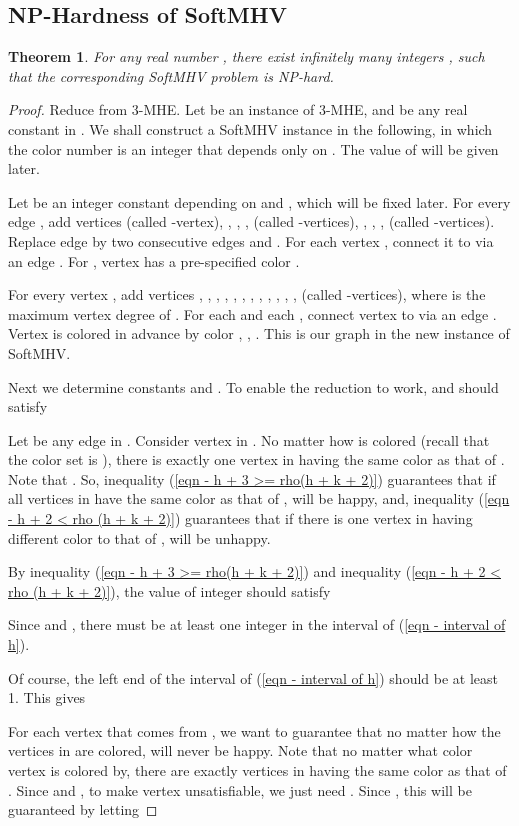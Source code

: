 \documentclass[11pt]{article}
\newtheorem{theorem}{Theorem}[section]
\begin{document}
\subsection{NP-Hardness of SoftMHV}
\begin{theorem}
For any real number , there exist infinitely many integers
, such that the corresponding SoftMHV problem is NP-hard.
\end{theorem}
\begin{proof}
Reduce from 3-MHE. Let  be an instance of 3-MHE, and  be any
real constant in . We shall construct a SoftMHV instance
 in the following, in which the color number  is an integer
that depends only on . The value of  will be given later.

Let  be an integer constant depending on  and , which will be
fixed later.
For every edge , add  vertices  (called
-vertex), , , ,  (called -vertices),
, , ,  (called -vertices).
Replace edge  by two consecutive edges 
and . For each vertex 
, connect it to  via an edge
.
For , vertex  has a pre-specified color .

For every vertex , add  vertices ,
, , , , , ,
, , , , ,
 (called -vertices), where  is the maximum vertex
degree of .
For each  and each , connect vertex
 to  via an edge . Vertex  is
colored in advance by color , , .
This is our graph  in the new instance of SoftMHV.

Next we determine constants  and .
To enable the reduction to work,  and  should satisfy

Let  be any edge in . Consider vertex  in .
No matter how  is colored (recall that the color set is
), there is exactly one vertex in
 having the same color as that of .
Note that .
So, inequality (\ref{eqn - h + 3 >= rho(h + k + 2)}) guarantees that
if all vertices in  have the same
color as that of ,  will be happy, and,
inequality (\ref{eqn - h + 2 < rho (h + k + 2)}) guarantees that
if there is one vertex in  having
different color to that of ,  will be unhappy.

By inequality (\ref{eqn - h + 3 >= rho(h + k + 2)}) and
inequality (\ref{eqn - h + 2 < rho (h + k + 2)}), the value of integer 
should satisfy

Since  and ,
there must be at least one integer in the interval of
(\ref{eqn - interval of h}).

Of course, the left end of the interval of (\ref{eqn - interval of h})
should be at least 1. This gives


For each vertex  that comes from , we want to guarantee that
no matter how the vertices in  are colored,  will never be happy.
Note that no matter what color vertex  is colored by,
there are exactly  vertices in
 having the
same color as that of .
Since  and ,
to make vertex  unsatisfiable, we just need .
Since , this will be
guaranteed by letting



\end{proof}
\end{document}
